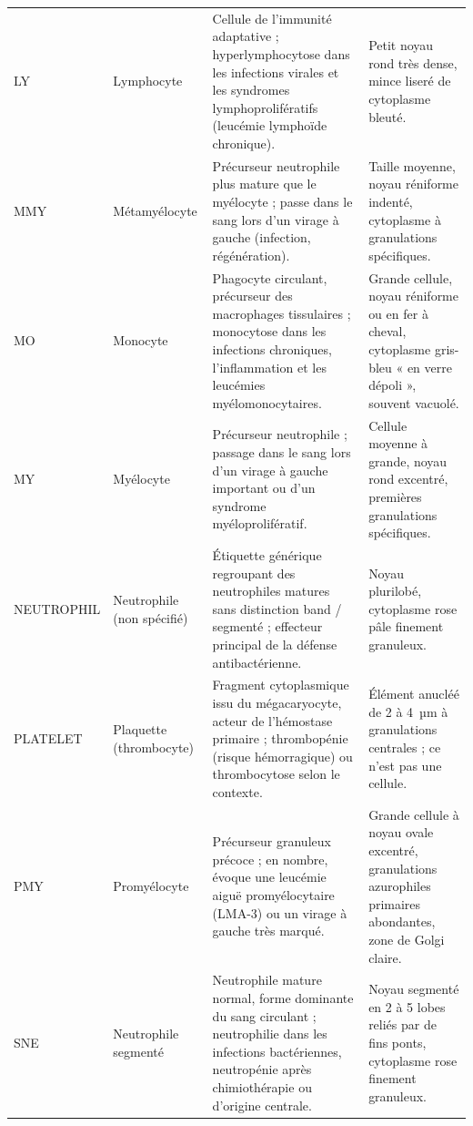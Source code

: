 \begin{longtable}{@{}>{\raggedright\arraybackslash}p{2.6cm} >{\raggedright\arraybackslash}p{2.5cm} >{\raggedright\arraybackslash}p{5.9cm} >{\raggedright\arraybackslash}p{4.0cm}@{}}
  LY         & Lymphocyte                       & Cellule de l’immunité adaptative ; hyperlymphocytose dans les infections virales et les syndromes lymphoprolifératifs (leucémie lymphoïde chronique). & Petit noyau rond très dense, mince liseré de cytoplasme bleuté. \\
  MMY        & Métamyélocyte                    & Précurseur neutrophile plus mature que le myélocyte ; passe dans le sang lors d’un virage à gauche (infection, régénération). & Taille moyenne, noyau réniforme indenté, cytoplasme à granulations spécifiques. \\
  MO         & Monocyte                         & Phagocyte circulant, précurseur des macrophages tissulaires ; monocytose dans les infections chroniques, l’inflammation et les leucémies myélomonocytaires. & Grande cellule, noyau réniforme ou en fer à cheval, cytoplasme gris-bleu « en verre dépoli », souvent vacuolé. \\
  MY         & Myélocyte                        & Précurseur neutrophile ; passage dans le sang lors d’un virage à gauche important ou d’un syndrome myéloprolifératif. & Cellule moyenne à grande, noyau rond excentré, premières granulations spécifiques. \\
  NEUTROPHIL & Neutrophile (non spécifié)       & Étiquette générique regroupant des neutrophiles matures sans distinction band / segmenté ; effecteur principal de la défense antibactérienne. & Noyau plurilobé, cytoplasme rose pâle finement granuleux. \\
  PLATELET   & Plaquette (thrombocyte)          & Fragment cytoplasmique issu du mégacaryocyte, acteur de l’hémostase primaire ; thrombopénie (risque hémorragique) ou thrombocytose selon le contexte. & Élément anucléé de 2 à 4~µm à granulations centrales ; ce n’est pas une cellule. \\
  PMY        & Promyélocyte                     & Précurseur granuleux précoce ; en nombre, évoque une leucémie aiguë promyélocytaire (LMA-3) ou un virage à gauche très marqué. & Grande cellule à noyau ovale excentré, granulations azurophiles primaires abondantes, zone de Golgi claire. \\
  SNE        & Neutrophile segmenté             & Neutrophile mature normal, forme dominante du sang circulant ; neutrophilie dans les infections bactériennes, neutropénie après chimiothérapie ou d’origine centrale. & Noyau segmenté en 2 à 5 lobes reliés par de fins ponts, cytoplasme rose finement granuleux. \\
\end{longtable}

